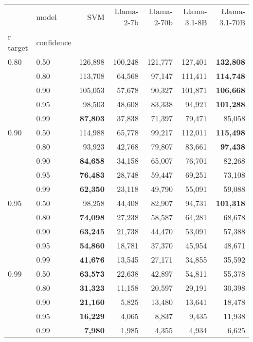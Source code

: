 \begin{tabular}{llrrrrr}
\toprule
 & model & SVM & Llama-2-7b & Llama-2-70b & Llama-3.1-8B & Llama-3.1-70B \\
r target & confidence &  &  &  &  &  \\
\midrule
0.80 & 0.50 & 126,898 & 100,248 & 121,777 & 127,401 & \textbf{132,808} \\
 & 0.80 & 113,708 & 64,568 & 97,147 & 111,411 & \textbf{114,748} \\
 & 0.90 & 105,053 & 57,678 & 90,327 & 101,871 & \textbf{106,668} \\
 & 0.95 & 98,503 & 48,608 & 83,338 & 94,921 & \textbf{101,288} \\
 & 0.99 & \textbf{87,803} & 37,838 & 71,397 & 79,471 & 85,058 \\
\cline{1-7}
0.90 & 0.50 & 114,988 & 65,778 & 99,217 & 112,011 & \textbf{115,498} \\
 & 0.80 & 93,923 & 42,768 & 79,807 & 83,661 & \textbf{97,438} \\
 & 0.90 & \textbf{84,658} & 34,158 & 65,007 & 76,701 & 82,268 \\
 & 0.95 & \textbf{76,483} & 28,748 & 59,447 & 69,251 & 73,108 \\
 & 0.99 & \textbf{62,350} & 23,118 & 49,790 & 55,091 & 59,088 \\
\cline{1-7}
0.95 & 0.50 & 98,258 & 44,408 & 82,907 & 94,731 & \textbf{101,318} \\
 & 0.80 & \textbf{74,098} & 27,238 & 58,587 & 64,281 & 68,678 \\
 & 0.90 & \textbf{63,245} & 21,738 & 44,470 & 53,091 & 57,388 \\
 & 0.95 & \textbf{54,860} & 18,781 & 37,370 & 45,954 & 48,671 \\
 & 0.99 & \textbf{41,676} & 13,545 & 27,171 & 34,855 & 35,592 \\
\cline{1-7}
0.99 & 0.50 & \textbf{63,573} & 22,638 & 42,897 & 54,811 & 55,378 \\
 & 0.80 & \textbf{31,323} & 11,158 & 20,597 & 29,191 & 30,398 \\
 & 0.90 & \textbf{21,160} & 5,825 & 13,480 & 13,641 & 18,478 \\
 & 0.95 & \textbf{16,229} & 4,065 & 8,837 & 9,435 & 11,938 \\
 & 0.99 & \textbf{7,980} & 1,985 & 4,355 & 4,934 & 6,625 \\
\cline{1-7}
\bottomrule
\end{tabular}
